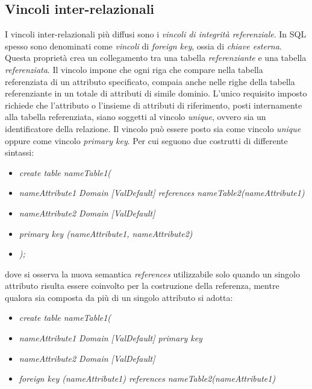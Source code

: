 \documentclass{article}
\begin{document}
\subsection*{Vincoli inter-relazionali}
I vincoli inter-relazionali più diffusi sono i \textit{vincoli di integrità referenziale}. In SQL spesso sono denominati come \textit{vincoli} di \textit{foreign key}, ossia di \textit{chiave esterna}. Questa proprietà crea un collegamento tra una tabella \textit{referenziante} e una tabella \textit{referenziata}. Il vincolo impone che ogni riga che compare nella tabella referenziata di un attributo specificato, compaia anche nelle righe della tabella referenziante in un totale di attributi di simile dominio. L'unico requisito imposto richiede che l'attributo o l'insieme di attributi di riferimento, posti internamente alla tabella referenziata, siano soggetti al vincolo \textit{unique}, ovvero sia un identificatore della relazione. Il vincolo può essere posto sia come vincolo \textit{unique} oppure come vincolo \textit{primary key}. Per cui seguono due costrutti di differente sintassi:
\begin{itemize}[label={ }, leftmargin=1cm]
    \item \textit{create table nameTable1(}
\end{itemize}
\begin{itemize}[label={ }, leftmargin=2cm]
    \itemsep0em
    \item \textit{nameAttribute1 Domain [ValDefault] references nameTable2(nameAttribute1)}
    \item \textit{nameAttribute2 Domain [ValDefault]}
    \item \textit{primary key (nameAttribute1, nameAttribute2)}
\end{itemize}
\begin{itemize}[label={ }, leftmargin=1cm]
    \item \textit{);}
\end{itemize}
dove si osserva la nuova semantica \textit{references} utilizzabile solo quando un singolo attributo risulta essere coinvolto per la costruzione della referenza, mentre qualora sia composta da più di un singolo attributo si adotta:
\begin{itemize}[label={ }, leftmargin=1cm]
    \item \textit{create table nameTable1(}
\end{itemize}
\begin{itemize}[label={ }, leftmargin=2cm]
    \itemsep0em
    \item \textit{nameAttribute1 Domain [ValDefault] primary key}
    \item \textit{nameAttribute2 Domain [ValDefault]}
    \item \textit{foreign key (nameAttribute1) references nameTable2(nameAttribute1)}
\end{itemize}
\end{document}
